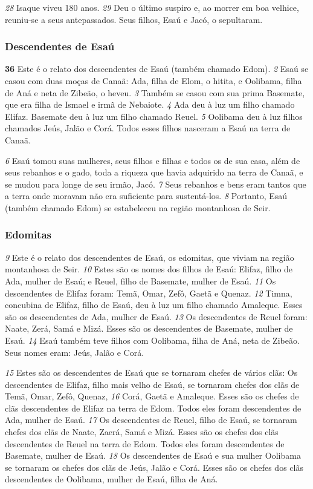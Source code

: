 \bigskip   
\textit{\tiny 28}
Isaque viveu 180 anos. 
\textit{\tiny 29}
Deu o último suspiro e, ao morrer em boa velhice, reuniu-se a seus antepassados. Seus filhos, Esaú e Jacó, o sepultaram.
   
\bigskip   
\subsubsection*{Descendentes de Esaú}
\textbf{\large 36}
 Este é o relato dos descendentes de Esaú (também chamado Edom). 
\textit{\tiny 2} 
Esaú
se casou com duas moças de Canaã: Ada, filha de Elom, o hitita, e Oolibama, filha
de Aná e neta de Zibeão, o heveu. 
\textit{\tiny 3} 
Também se casou com sua prima Basemate,
que era filha de Ismael e irmã de Nebaiote. 
\textit{\tiny 4} 
Ada deu à luz um filho chamado
Elifaz. Basemate deu à luz um filho chamado Reuel. 
\textit{\tiny 5} 
Oolibama deu à luz filhos
chamados Jeús, Jalão e Corá. Todos esses filhos nasceram a Esaú na terra de
Canaã. 

\bigskip   
\textit{\tiny 6} 
Esaú tomou suas mulheres, seus filhos e filhas e todos os de sua casa, além de
seus rebanhos e o gado, toda a riqueza que havia adquirido na terra de Canaã, e se
mudou para longe de seu irmão, Jacó. 
\textit{\tiny 7} 
Seus rebanhos e bens eram tantos que a
terra onde moravam não era suficiente para sustentá-los. 
\textit{\tiny 8} 
Portanto, Esaú
(também chamado Edom) se estabeleceu na região montanhosa de Seir. 

\bigskip   
\subsubsection*{Edomitas}
\textit{\tiny 9} 
Este é o relato dos descendentes de Esaú, os edomitas, que viviam na região
montanhosa de Seir.
\textit{\tiny 10}
Estes são os nomes dos filhos de Esaú: Elifaz, filho de Ada, mulher de Esaú; e
 Reuel, filho de Basemate, mulher de Esaú.
\textit{\tiny 11}
Os descendentes de Elifaz foram: Temã, Omar, Zefô, Gaetã e Quenaz. 
\textit{\tiny 12}
Timna,
 concubina de Elifaz, filho de Esaú, deu à luz um filho chamado Amaleque. Esses
 são os descendentes de Ada, mulher de Esaú.
\textit{\tiny 13}
Os descendentes de Reuel foram: Naate, Zerá, Samá e Mizá. Esses são os
 descendentes de Basemate, mulher de Esaú.
\textit{\tiny 14}
Esaú também teve filhos com Oolibama, filha de Aná, neta de Zibeão. Seus
 nomes eram: Jeús, Jalão e Corá.

\bigskip   
\textit{\tiny 15}
Estes são os descendentes de Esaú que se tornaram chefes de vários clãs:
Os descendentes de Elifaz, filho mais velho de Esaú, se tornaram chefes dos clãs
 de Temã, Omar, Zefô, Quenaz, 
\textit{\tiny 16}
Corá, Gaetã e Amaleque. Esses são os chefes de
 clãs descendentes de Elifaz na terra de Edom. Todos eles foram descendentes de
 Ada, mulher de Esaú.
\textit{\tiny 17}
Os descendentes de Reuel, filho de Esaú, se tornaram chefes dos clãs de Naate,
 Zaerá, Samá e Mizá. Esses são os chefes dos clãs descendentes de Reuel na terra
 de Edom. Todos eles foram descendentes de Basemate, mulher de Esaú.
\textit{\tiny 18}
Os descendentes de Esaú e sua mulher Oolibama se tornaram os chefes dos clãs
 de Jeús, Jalão e Corá. Esses são os chefes dos clãs descendentes de Oolibama,
 mulher de Esaú, filha de Aná.

